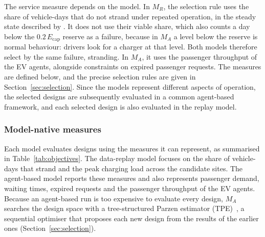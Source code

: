 \documentclass{elsarticle}
\newcommand{\MR}{\ensuremath{M_R}}
\newcommand{\MA}{\ensuremath{M_A}}
\begin{document}
The service measure depends on the model. In \(\MR\), the selection rule uses the share of vehicle-days that do not strand under repeated operation, in the steady state described by \citet{pretorius2024_grid_mobility_interdependence}. It does not use their viable share, which also counts a day below the \(0.2\,E_\mathrm{cap}\) reserve as a failure, because in \(\MA\) a level below the reserve is normal behaviour: drivers look for a charger at that level. Both models therefore select by the same failure, stranding. In \(\MA\), it uses the passenger throughput of the EV agents, alongside constraints on expired passenger requests. The measures are defined below, and the precise selection rules are given in Section~\ref{sec:selection}. Since the models represent different aspects of operation, the selected designs are subsequently evaluated in a common agent-based framework, and each selected design is also evaluated in the replay model.

\subsubsection{Model-native measures}
\label{sec:objectives}

Each model evaluates designs using the measures it can represent, as summarised in Table~\ref{tab:objectives}. The data-replay model focuses on the share of vehicle-days that strand and the peak charging load across the candidate sites. The agent-based model reports these measures and also represents passenger demand, waiting times, expired requests and the passenger throughput of the EV agents. Because an agent-based run is too expensive to evaluate every design, \(\MA\) searches the design space with a tree-structured Parzen estimator (TPE)~\cite{watanabe2026_tpe}, a sequential optimiser that proposes each new design from the results of the earlier ones (Section~\ref{sec:selection}).
\end{document}
